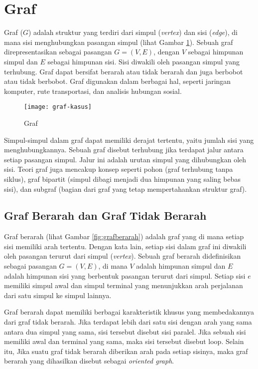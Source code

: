 \section{Graf ~\cite{Diestel:17:graph}}
\label{sec:graph}
Graf ($G$) adalah struktur yang terdiri dari simpul (\textit{vertex}) dan sisi (\textit{edge}), di mana sisi menghubungkan pasangan simpul (lihat Gambar \ref{fig:graf}). Sebuah graf direpresentasikan sebagai pasangan $G=(V,E)$, dengan $V$ sebagai himpunan simpul dan $E$ sebagai himpunan sisi. Sisi diwakili oleh pasangan simpul yang terhubung. Graf dapat bersifat berarah atau tidak berarah dan juga berbobot atau tidak berbobot. Graf digunakan dalam berbagai hal, seperti jaringan komputer, rute transportasi, dan analisis hubungan sosial.
\begin{figure}[H] 
    \centering  
    \texttt{[image: graf-kasus]}  
    \caption{Graf}
    \label{fig:graf} 
\end{figure}

Simpul-simpul dalam graf dapat memiliki derajat tertentu, yaitu jumlah sisi yang menghubungkannya. Sebuah graf disebut terhubung jika terdapat jalur antara setiap pasangan simpul. Jalur ini adalah urutan simpul yang dihubungkan oleh sisi. Teori graf juga mencakup konsep seperti pohon (graf terhubung tanpa siklus), graf bipartit (simpul dibagi menjadi dua himpunan yang saling bebas sisi), dan subgraf (bagian dari graf yang tetap mempertahankan struktur graf).

\subsection{Graf Berarah dan Graf Tidak Berarah~\cite{Diestel:17:graph}}
\label{sec:grafberarah}
Graf berarah (lihat Gambar \ref{fig:grafberarah}) adalah graf yang di mana setiap sisi memiliki arah tertentu. Dengan kata lain, setiap sisi dalam graf ini diwakili oleh pasangan terurut dari simpul (\textit{vertex}). Sebuah graf berarah didefinisikan sebagai pasangan $G=(V,E)$, di mana $V$ adalah himpunan simpul dan $E$ adalah himpunan sisi yang berbentuk pasangan terurut dari simpul. Setiap sisi $e$ memiliki simpul awal dan simpul terminal yang menunjukkan arah perjalanan dari satu simpul ke simpul lainnya.

Graf berarah dapat memiliki berbagai karakteristik khusus yang membedakannya dari graf tidak berarah. Jika terdapat lebih dari satu sisi dengan arah yang sama antara dua simpul yang sama, sisi tersebut disebut sisi paralel. Jika sebuah sisi memiliki awal dan terminal yang sama, maka sisi tersebut disebut loop. Selain itu, Jika suatu graf tidak berarah diberikan arah pada setiap sisinya, maka graf berarah yang dihasilkan disebut sebagai \textit{oriented graph}.

